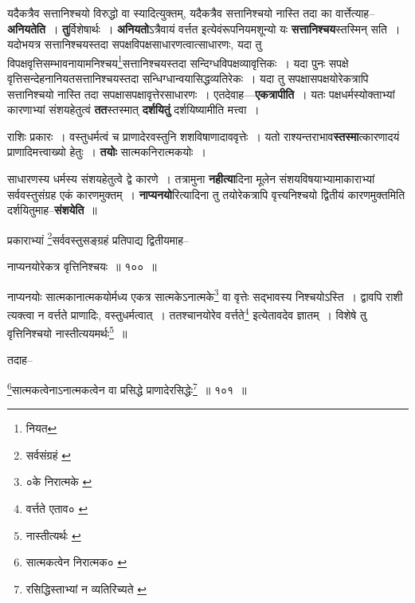 \documentclass[article,12pt,a4paper]{memoir}
\begin{document}
	  \endgroup
	

	  \pstart यदैकत्रैव सत्तानिश्चयो विरुद्धो वा स्यादित्युक्तम्, यदैकत्रैव सत्तानिश्चयो नास्ति तदा का वार्त्तेत्याह--\textbf{अनियतेति} । \textbf{तु}र्विशेषार्थः । \textbf{अनियतो}ऽत्रैवायं वर्त्तत इत्येवंरूपनियमशून्यो यः \textbf{सत्तानिश्चय}स्तस्मिन् सति । यदोभयत्र सत्तानिश्चयस्तदा सपक्षविपक्षसाधारणत्वात्साधारणः, यदा तु विपक्षवृत्तिसम्भावनायामनिश्चय\footnote{नियत}सत्तानिश्चयस्तदा सन्दिग्धविपक्षव्यावृत्तिकः । यदा पुनः सपक्षे वृत्तिसन्देहनानियतसत्तानिश्चयस्तदा सन्धिग्धान्वयासिद्धव्यतिरेकः । यदा तु सपक्षासपक्षयोरेकत्रापि सत्तानिश्चयो नास्ति तदा सपक्षासपक्षावृत्तेरसाधारणः । एतदेवाह—\textbf{एकत्रापीति} । यतः पक्षधर्मस्योक्ताभ्यां कारणाभ्यां संशयहेतुत्वं \textbf{तत}स्तस्मात् \textbf{दर्शयितुं} दर्शयिष्यामीति मत्त्वा ।
	\pend
      

	  \pstart राशिः प्रकारः । वस्तुधर्मत्वं च प्राणादेरवस्तुनि शशविषाणादाववृत्तेः । यतो राश्यन्तराभाव\textbf{स्तस्मा}त्कारणादयं प्राणादिमत्त्वाख्यो हेतुः । \textbf{तयोः} सात्मकनिरात्मकयोः ।
	\pend
      

	  \pstart साधारणस्य धर्मस्य संशयहेतुत्वे द्वे कारणे । तत्रामुना \textbf{नहीत्या}दिना मूलेन संशयविषयाभ्यामाकाराभ्यां सर्ववस्तुसंग्रह एकं कारणमुक्तम् । \textbf{नाप्यनयो}रित्यादिना तु तयोरेकत्रापि वृत्त्यनिश्चयो द्वितीयं कारणमुक्तमिति दर्शयितुमाह--\textbf{संशयेति} ॥
	\pend
      \leavevmode{}
	  \bigskip
	  \begingroup
	

	  \pstart प्रकाराभ्यां \footnote{सर्वसंग्रहं \cite{dp-msA} \cite{dp-msB} \cite{dp-msC} \cite{dp-edP} \cite{dp-edH} \cite{dp-edE} \cite{dp-edN}}सर्ववस्तुसङ्ग्रहं प्रतिपाद्य द्वितीयमाह--
	\pend
       
	  \bigskip
	  \begingroup
	

	  \pstart नाप्यनयोरेकत्र वृत्तिनिश्चयः ॥ १०० ॥
	\pend
      
	  \endgroup
	 

	  \pstart नाप्यनयोः सात्मकानात्मकयोर्मध्य एकत्र सात्मकेऽनात्मके\footnote{०के निरात्मके \cite{dp-msC}} वा वृत्तेः सद्भावस्य निश्चयोऽस्ति । द्वावपि राशी त्यक्त्वा न वर्त्तते प्राणादिः, वस्तुधर्मत्वात् । ततश्चानयोरेव वर्त्तते\footnote{वर्त्तते एताव० \cite{dp-msC}} इत्येतावदेव ज्ञातम् । विशेषे तु वृत्तिनिश्चयो नास्तीत्ययमर्थः\footnote{नास्तीत्यर्थः \cite{dp-msC} \cite{dp-msD}} ॥
	\pend
       

	  \pstart तदाह--
	\pend
       
	  \bigskip
	  \begingroup
	

	  \pstart \footnote{सात्मकत्वेन निरात्मक० \cite{dp-msB} \cite{dp-edP} \cite{dp-edH} \cite{dp-edE} \cite{dp-edN}}सात्मकत्वेनाऽनात्मकत्वेन वा प्रसिद्धे प्राणादेरसिद्धेः\footnote{रसिद्धिस्ताभ्यां न व्यतिरिच्यते \cite{dp-edE}} ॥ १०१ ॥
	\pend
      
\end{document}
